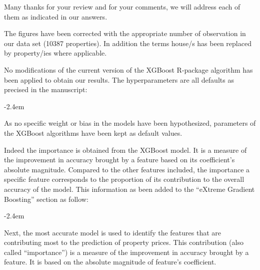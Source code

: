 \documentclass[]{article}
\renewenvironment{quote}{\begin{fquote}\advance\leftmargini -2.4em\begin{oldquote}}{\end{oldquote}\end{fquote}}
\newenvironment{fquote}
  {\def\FrameCommand{
	\fboxsep=0.6em %
	\fcolorbox{black}{white}}%
    \MakeFramed {\advance\hsize-2\width \FrameRestore}
    \begin{minipage}{\linewidth}
  }
  {\end{minipage}\endMakeFramed}
\begin{document}
Many thanks for your review and for your comments, we will address each of them as indicated in our answers.


The figures have been corrected with the appropriate number of observation in our data set (10387 properties). In addition the terms house/s has been replaced by property/ies where applicable.


No modifications of the current version of the XGBoost R-package algorithm has been applied to obtain our results. The hyperparameters are all defaults as precised in the manuscript:

\begin{quote}
As no specific weight or bias in the models have been hypothesized, parameters of the XGBoost algorithms have been kept as default values.
\end{quote}


Indeed the importance is obtained from the XGBoost model. It is a measure of the improvement in accuracy brought by a feature based on its coefficient's absolute magnitude. Compared to the other features included, the importance a specific feature corresponds to the proportion of its contribution to the overall accuracy of the model. This information as been added to the ``eXtreme Gradient Boosting'' section as follow:

\begin{quote}
Next, the most accurate model is used to identify the features that are contributing most to the prediction of property prices. This contribution (also called ``importance'') is a measure of the improvement in accuracy brought by a feature. It is based on the absolute magnitude of feature's coefficient.
\end{quote}
\end{document}
